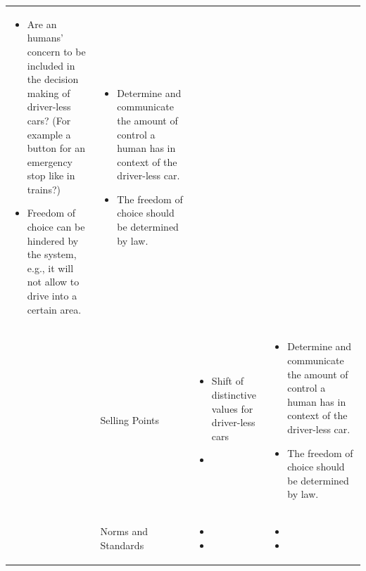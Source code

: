 \begin{table}
\begin{small}
\begin{supertabular}{>{}p{.02\textwidth}|>{\raggedright}p{.105\textwidth}>{\raggedright}p{.4\textwidth}>{\raggedright}p{.4\textwidth}}
\begin{itemize}
					\item Are an humans' concern to be included in the decision making of driver-less cars? (For example a button for an emergency stop like in trains?)
					\item Freedom of choice can be hindered by the system, e.g., it will not allow to drive into a certain area.
				\end{itemize}         
			& 
				\begin{itemize}
					\item Determine and communicate the amount of control a human has in context of the driver-less car.
					\item The freedom of choice should be determined by law.
				\end{itemize}         
 			 \tabularnewline {}
  			& Selling Points & 
				\begin{itemize}
					\item Shift of distinctive values for driver-less cars
					\item 
				\end{itemize}         
			& 
				\begin{itemize}
					\item Determine and communicate the amount of control a human has in context of the driver-less car.
					\item The freedom of choice should be determined by law.
				\end{itemize}         
 			 \tabularnewline {}
			& Norms and Standards & 
				\begin{itemize}
					\item 
					\item  
				\end{itemize}         
			& 
				\begin{itemize}
					\item 
					\item  
				\end{itemize}   
 			 \tabularnewline 					
			\bottomrule
		\end{supertabular}
	\end{small}
	
\end{table}


